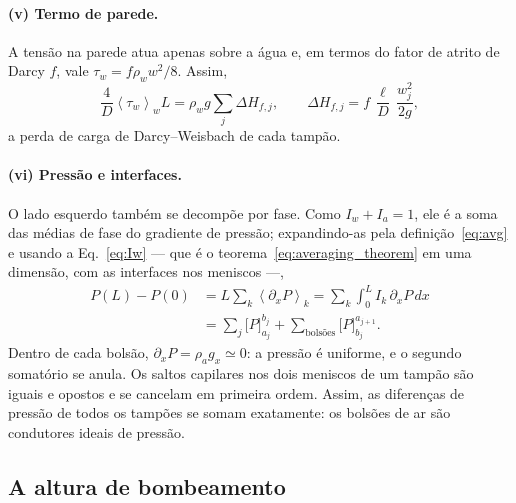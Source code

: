 \documentclass[aps,pre,twocolumn,superscriptaddress,nofootinbib,floatfix]{revtex4-2}
\newcommand{\avg}[1]{\left\langle #1 \right\rangle}
\begin{document}
\paragraph*{(v) Termo de parede.} A tensão na parede atua apenas sobre a água e, em termos do fator de atrito de Darcy $f$, vale $\tau_w=f\rho_ww^2/8$. Assim,
\begin{equation}
  \frac{4}{D}\avg{\tau_w}_wL = \rho_w g\sum_j\Delta H_{f,j}, \qquad
  \Delta H_{f,j} = f\,\frac{\ell}{D}\,\frac{w_j^2}{2g},
  \label{eq:term_w}
\end{equation}
a perda de carga de Darcy--Weisbach de cada tampão.

\paragraph*{(vi) Pressão e interfaces.} O lado esquerdo também se decompõe por fase. Como $I_w+I_a=1$, ele é a soma das médias de fase do gradiente de pressão; expandindo-as pela definição~\eqref{eq:avg} e usando a Eq.~\eqref{eq:Iw} --- que é o teorema~\eqref{eq:averaging_theorem} em uma dimensão, com as interfaces nos meniscos ---,
\begin{align}
  P(L)-P(0) &= L\sum_k\avg{\partial_xP}_k = \sum_k\int_0^L I_k\,\partial_xP\,dx \nonumber\\
  &= \sum_j\big[P\big]_{a_j}^{b_j} + \sum_{\text{bolsões}}\big[P\big]_{b_j}^{a_{j+1}} .
  \label{eq:sum}
\end{align}
Dentro de cada bolsão, $\partial_xP=\rho_ag_x\simeq0$: a pressão é uniforme, e o segundo somatório se anula. Os saltos capilares nos dois meniscos de um tampão são iguais e opostos e se cancelam em primeira ordem. Assim, as diferenças de pressão de todos os tampões se somam exatamente: os bolsões de ar são condutores ideais de pressão.

\subsection{A altura de bombeamento}
\end{document}
